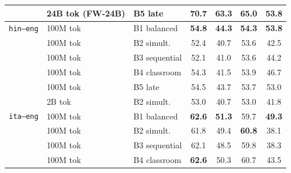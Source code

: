 \documentclass[11pt]{article}
\begin{document}
\begin{table}[!ht]
\begin{minipage}[t]{0.49\linewidth}
\begin{tabular}{ll l cccc}
 & 24B tok (FW-24B) & B5 late & \cellcolor[rgb]{0.787,1.000,0.787} \textbf{70.7} & \cellcolor[rgb]{0.843,1.000,0.843} \textbf{63.3} & \cellcolor[rgb]{0.802,1.000,0.802} \textbf{65.0} & \cellcolor[rgb]{1.000,0.942,0.942} 53.8 \\
\midrule
\midrule
\texttt{hin--eng} & 100M tok & B1 balanced & \cellcolor[rgb]{0.950,1.000,0.950} \textbf{54.8} & \cellcolor[rgb]{1.000,0.945,0.945} \textbf{44.3} & \cellcolor[rgb]{0.943,1.000,0.943} \textbf{54.3} & \cellcolor[rgb]{0.922,1.000,0.922} \textbf{53.8} \\
 & 100M tok & B2 simult. & \cellcolor[rgb]{0.975,1.000,0.975} 52.4 & \cellcolor[rgb]{1.000,0.910,0.910} 40.7 & \cellcolor[rgb]{0.952,1.000,0.952} 53.6 & \cellcolor[rgb]{1.000,0.917,0.917} 42.5 \\
 & 100M tok & B3 sequential & \cellcolor[rgb]{0.978,1.000,0.978} 52.1 & \cellcolor[rgb]{1.000,0.913,0.913} 41.0 & \cellcolor[rgb]{0.952,1.000,0.952} 53.6 & \cellcolor[rgb]{1.000,0.936,0.936} 44.2 \\
 & 100M tok & B4 classroom & \cellcolor[rgb]{0.955,1.000,0.955} 54.3 & \cellcolor[rgb]{1.000,0.918,0.918} 41.5 & \cellcolor[rgb]{0.948,1.000,0.948} 53.9 & \cellcolor[rgb]{1.000,0.964,0.964} 46.7 \\
 & 100M tok & B5 late & \cellcolor[rgb]{0.953,1.000,0.953} 54.5 & \cellcolor[rgb]{1.000,0.939,0.939} 43.7 & \cellcolor[rgb]{0.951,1.000,0.951} 53.7 & \cellcolor[rgb]{0.939,1.000,0.939} 53.0 \\
\addlinespace[1.5pt]
 & 2B tok & B2 simult. & \cellcolor[rgb]{0.969,1.000,0.969} 53.0 & \cellcolor[rgb]{1.000,0.910,0.910} 40.7 & \cellcolor[rgb]{0.960,1.000,0.960} 53.0 & \cellcolor[rgb]{1.000,0.910,0.910} 41.8 \\
\midrule
\texttt{ita--eng} & 100M tok & B1 balanced & \cellcolor[rgb]{0.869,1.000,0.869} \textbf{62.6} & \cellcolor[rgb]{0.984,1.000,0.984} \textbf{51.3} & \cellcolor[rgb]{0.872,1.000,0.872} 59.7 & \cellcolor[rgb]{1.000,0.992,0.992} \textbf{49.3} \\
 & 100M tok & B2 simult. & \cellcolor[rgb]{0.877,1.000,0.877} 61.8 & \cellcolor[rgb]{1.000,0.994,0.994} 49.4 & \cellcolor[rgb]{0.857,1.000,0.857} \textbf{60.8} & \cellcolor[rgb]{1.000,0.869,0.869} 38.1 \\
 & 100M tok & B3 sequential & \cellcolor[rgb]{0.874,1.000,0.874} 62.1 & \cellcolor[rgb]{1.000,0.986,0.986} 48.5 & \cellcolor[rgb]{0.870,1.000,0.870} 59.8 & \cellcolor[rgb]{1.000,0.871,0.871} 38.3 \\
 & 100M tok & B4 classroom & \cellcolor[rgb]{0.869,1.000,0.869} \textbf{62.6} & \cellcolor[rgb]{0.996,1.000,0.996} 50.3 & \cellcolor[rgb]{0.858,1.000,0.858} 60.7 & \cellcolor[rgb]{1.000,0.928,0.928} 43.5 \\

\end{tabular}
\end{minipage}
\end{table}
\end{document}
